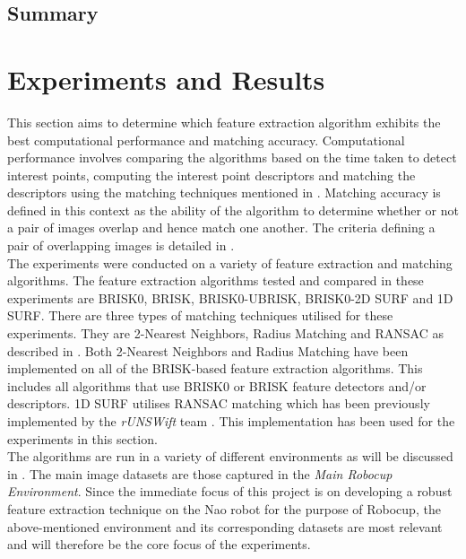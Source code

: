 \documentclass[11pt]{report}
\begin{document}
\section{Summary}
\label{sec:summary4}



\chapter{Experiments and Results}
\label{sec:experimentsResults}
This section aims to determine which feature extraction algorithm exhibits the best  computational performance and matching accuracy. Computational performance involves comparing the algorithms based on the time taken to detect interest points, computing the interest point descriptors and matching the descriptors using the matching techniques mentioned in . Matching accuracy is defined in this context as the ability of the algorithm to determine whether or not a pair of images overlap and hence match one another. The criteria defining a pair of overlapping images is detailed in .\\


The experiments were conducted on a variety of feature extraction and matching algorithms. The feature extraction algorithms tested and compared in these experiments are BRISK0, BRISK, BRISK0-UBRISK, BRISK0-2D SURF and 1D SURF. There are three types of matching techniques utilised for these experiments. They are 2-Nearest Neighbors, Radius Matching and RANSAC as described in . Both 2-Nearest Neighbors and Radius Matching have been implemented on all of the BRISK-based feature extraction algorithms. This includes all algorithms that use BRISK0 or BRISK feature detectors and/or descriptors. 1D SURF utilises RANSAC matching which has been previously implemented by the \textit{rUNSWift} team \cite{Anderson}. This implementation has been used for the experiments in this section.\\ 

The algorithms are run in a variety of different environments as will be discussed in . The main image datasets are those captured in the \textit{Main Robocup Environment}. Since the immediate focus of this project is on developing a robust feature extraction technique on the Nao robot for the purpose of Robocup, the above-mentioned environment  and its corresponding datasets are most relevant and will therefore be the core focus of the experiments.\\
\end{document}
